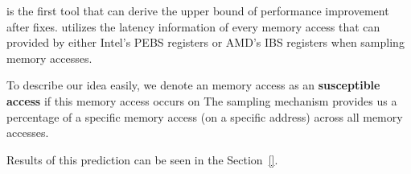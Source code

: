 \Cheetah{} is the first tool that can derive the upper bound of performance improvement after fixes. \Cheetah{} utilizes the latency  information of every memory access that can provided by either Intel's PEBS registers or AMD's IBS registers when sampling memory accesses. 

To describe our idea easily, we denote an memory access as an {\bf susceptible access} if this memory access occurs on  
The sampling mechanism provides us a percentage of a specific memory access (on a specific address) across all memory accesses. 











Results of this prediction can be seen in the Section~\ref{}. 


